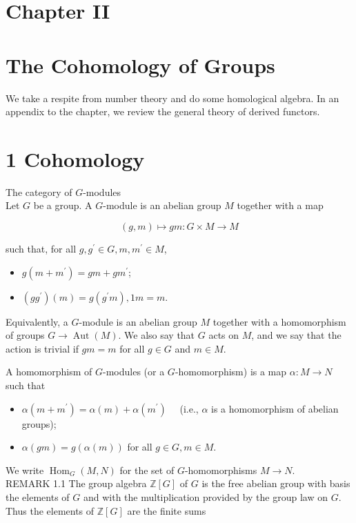 \documentclass[10pt]{article}
\begin{document}
\captionsetup{singlelinecheck=false}
\section*{Chapter II}
\section*{The Cohomology of Groups}
We take a respite from number theory and do some homological algebra. In an appendix to the chapter, we review the general theory of derived functors.

\section*{1 Cohomology}
The category of $G$-modules\\
Let $G$ be a group. A $G$-module is an abelian group $M$ together with a map

$$
(g, m) \mapsto g m: G \times M \rightarrow M
$$

such that, for all $g, g^{\prime} \in G, m, m^{\prime} \in M$,

\begin{itemize}
  \item[(a)] $g\left(m+m^{\prime}\right)=g m+g m^{\prime}$;
  \item[(b)] $\left(g g^{\prime}\right)(m)=g\left(g^{\prime} m\right), 1 m=m$.
\end{itemize}

Equivalently, a $G$-module is an abelian group $M$ together with a homomorphism of groups $G \rightarrow \operatorname{Aut}(M)$. We also say that $G$ acts on $M$, and we say that the action is trivial if $g m=m$ for all $g \in G$ and $m \in M$.

A homomorphism of $G$-modules (or a $G$-homomorphism) is a map $\alpha: M \rightarrow N$ such that

\begin{itemize}
  \item[(a)] $\alpha\left(m+m^{\prime}\right)=\alpha(m)+\alpha\left(m^{\prime}\right) \quad$ (i.e., $\alpha$ is a homomorphism of abelian groups);
  \item[(b)] $\alpha(g m)=g(\alpha(m))$ for all $g \in G, m \in M$.
\end{itemize}

We write $\operatorname{Hom}_{G}(M, N)$ for the set of $G$-homomorphisms $M \rightarrow N$.\\
REMARK 1.1 The group algebra $\mathbb{Z}[G]$ of $G$ is the free abelian group with basis the elements of $G$ and with the multiplication provided by the group law on $G$. Thus the elements of $\mathbb{Z}[G]$ are the finite sums
\end{document}
